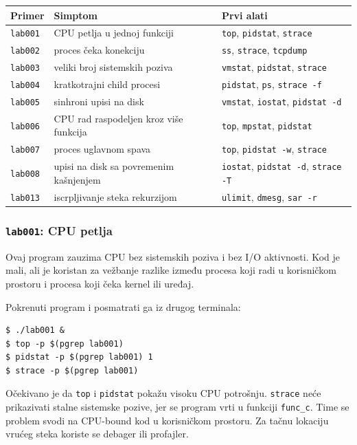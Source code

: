 \begin{longtable}[]{@{}lll@{}}
\toprule
Primer & Simptom & Prvi alati \\
\midrule
\endhead
\texttt{lab001} & CPU petlja u jednoj funkciji & \texttt{top}, \texttt{pidstat}, \texttt{strace} \\
\texttt{lab002} & proces čeka konekciju & \texttt{ss}, \texttt{strace}, \texttt{tcpdump} \\
\texttt{lab003} & veliki broj sistemskih poziva & \texttt{vmstat}, \texttt{pidstat}, \texttt{strace} \\
\texttt{lab004} & kratkotrajni child procesi & \texttt{pidstat}, \texttt{ps}, \texttt{strace -f} \\
\texttt{lab005} & sinhroni upisi na disk & \texttt{vmstat}, \texttt{iostat}, \texttt{pidstat -d} \\
\texttt{lab006} & CPU rad raspodeljen kroz više funkcija & \texttt{top}, \texttt{mpstat}, \texttt{pidstat} \\
\texttt{lab007} & proces uglavnom spava & \texttt{top}, \texttt{pidstat -w}, \texttt{strace} \\
\texttt{lab008} & upisi na disk sa povremenim kašnjenjem & \texttt{iostat}, \texttt{pidstat -d}, \texttt{strace -T} \\
\texttt{lab013} & iscrpljivanje steka rekurzijom & \texttt{ulimit}, \texttt{dmesg}, \texttt{sar -r} \\
\bottomrule
\end{longtable}

\subsubsection{\texorpdfstring{\texttt{lab001}: CPU petlja}{lab001: CPU petlja}}\label{lab001-cpu-petlja}

Ovaj program zauzima CPU bez sistemskih poziva i bez I/O aktivnosti. Kod je mali, ali je koristan za vežbanje razlike između procesa koji radi u korisničkom prostoru i procesa koji čeka kernel ili uređaj.


Pokrenuti program i posmatrati ga iz drugog terminala:

\begin{verbatim}
$ ./lab001 &
$ top -p $(pgrep lab001)
$ pidstat -p $(pgrep lab001) 1
$ strace -p $(pgrep lab001)
\end{verbatim}

Očekivano je da \texttt{top} i \texttt{pidstat} pokažu visoku CPU potrošnju. \texttt{strace} neće prikazivati stalne sistemske pozive, jer se program vrti u funkciji \texttt{func\_c}. Time se problem svodi na CPU-bound kod u korisničkom prostoru. Za tačnu lokaciju vrućeg steka koriste se debager ili profajler.

